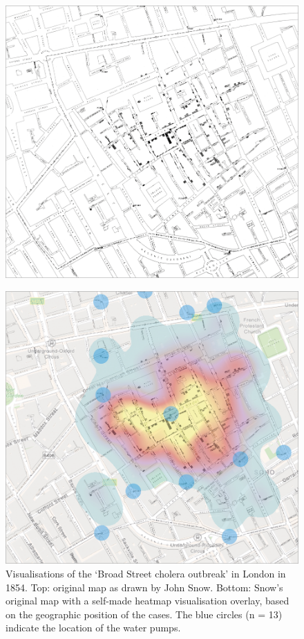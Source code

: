\documentclass[
]{book}
\begin{document}
\begin{figure}

{\centering \includegraphics[width=0.8\linewidth]{images/01-01a} 

}

\end{figure}
\begin{figure}

{\centering \includegraphics[width=0.8\linewidth]{images/01-01b} 

}

\caption{Visualisations of the ‘Broad Street cholera outbreak’ in London in 1854. Top: original map as drawn by John Snow. Bottom: Snow’s original map with a self-made heatmap visualisation overlay, based on the geographic position of the cases. The blue circles (n = 13) indicate the location of the water pumps.}\label{fig:fig1-1}
\end{figure}
\end{document}
